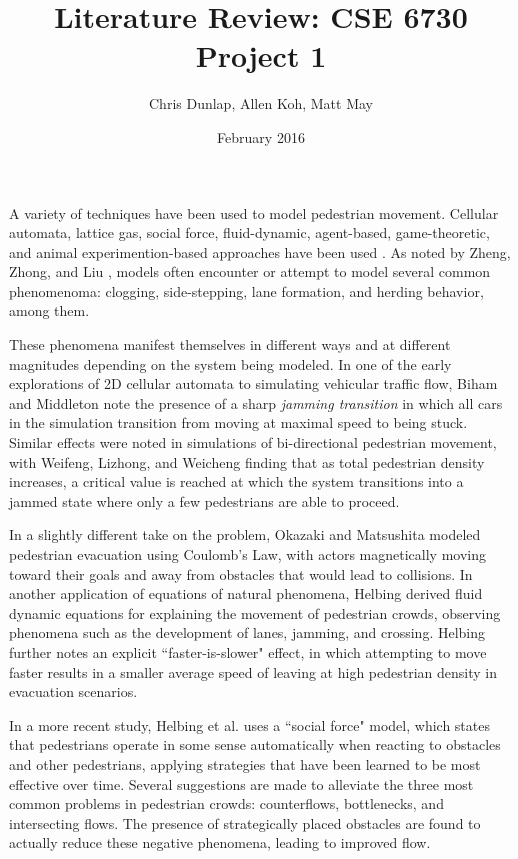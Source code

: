 \documentclass[12pt]{article}
\title{Literature Review: CSE 6730 Project 1}
\author{Chris Dunlap, Allen Koh, Matt May}
\date{February 2016}
\begin{document}
\begin{titlepage}
\maketitle
\thispagestyle{empty}
\end{titlepage}

A variety of techniques have been used to model pedestrian movement. Cellular
automata, lattice gas, social force, fluid-dynamic, agent-based, game-theoretic,
and animal experimention-based approaches have been used
\cite{zheng2009modeling}. As noted by Zheng, Zhong, and Liu
\cite{zheng2009modeling}, models often encounter or attempt to model several
common phenomenoma: clogging, side-stepping, lane formation, and herding
behavior, among them.

These phenomena manifest themselves in different ways and at different magnitudes
depending on the system being modeled. In one of the early explorations of 2D
cellular automata to simulating vehicular traffic flow, Biham and Middleton
\cite{biham1992self} note the presence of a sharp \textit{jamming transition}
in which all cars in the simulation transition from moving at maximal speed to
being stuck. Similar effects were noted in simulations of bi-directional
pedestrian movement, with Weifeng, Lizhong, and Weicheng
\cite{weifeng2003simulation} finding that as total pedestrian density increases,
a critical value is reached at which the system transitions into a jammed state
where only a few pedestrians are able to proceed.

In a slightly different take on the problem, Okazaki and Matsushita
\cite{okazaki1993study} modeled pedestrian evacuation using Coulomb's Law, with
actors magnetically moving toward their goals and away from obstacles that would
lead to collisions. In another application of equations of natural phenomena,
Helbing \cite{helbing1998fluid} derived fluid dynamic equations for explaining
the movement of pedestrian crowds, observing phenomena such as the development
of lanes, jamming, and crossing. Helbing \cite{helbing2000simulating} further
notes an explicit ``faster-is-slower" effect, in which attempting to move faster
results in a smaller average speed of leaving at high pedestrian density in
evacuation scenarios.

In a more recent study, Helbing et al. \cite{helbing2005self} uses a
``social force" model, which states that pedestrians operate in some sense
automatically when reacting to obstacles and other pedestrians, applying
strategies that have been learned to be most effective over time. Several
suggestions are made to alleviate the three most common problems in pedestrian
crowds: counterflows, bottlenecks, and intersecting flows. The presence of
strategically placed obstacles are found to actually reduce these negative
phenomena, leading to improved flow.
\end{document}

